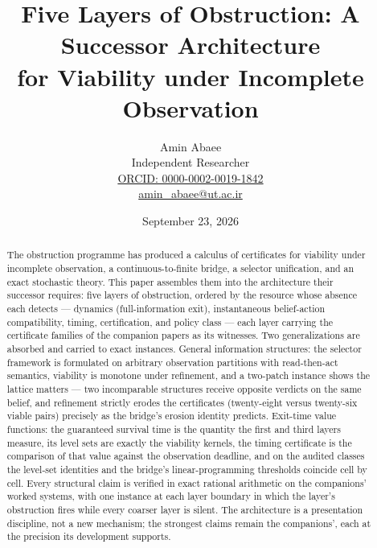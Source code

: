 \documentclass[10pt,twocolumn]{article}
\theoremstyle{definition}
\begin{document}
\title{Five Layers of Obstruction: A Successor Architecture\\ for Viability under Incomplete Observation}
\author{Amin Abaee\\[0.35em]
{\small Independent Researcher}\\[0.55em]
{\small\href{https://orcid.org/0000-0002-0019-1842}{ORCID: 0000-0002-0019-1842}}\\[0.3em]
{\small\href{mailto:amin\_abaee@ut.ac.ir}{amin\_abaee@ut.ac.ir}}}
\date{September 23, 2026}
\maketitle

\begin{abstract}

The obstruction programme has produced a calculus of certificates for
viability under incomplete observation, a continuous-to-finite bridge, a
selector unification, and an exact stochastic theory. This paper assembles
them into the architecture their successor requires: five layers of
obstruction, ordered by the resource whose absence each detects ---
dynamics (full-information exit), instantaneous belief-action compatibility,
timing, certification, and policy class --- each layer carrying the
certificate families of the companion papers as its witnesses. Two
generalizations are absorbed and carried to exact instances. General
information structures: the selector framework is formulated on arbitrary
observation partitions with read-then-act semantics, viability is monotone
under refinement, and a two-patch instance shows the lattice matters ---
two incomparable structures receive opposite verdicts on the same belief,
and refinement strictly erodes the certificates (twenty-eight versus
twenty-six viable pairs) precisely as the bridge's erosion identity
predicts. Exit-time value functions: the guaranteed survival time is the
quantity the first and third layers measure, its level sets are exactly the
viability kernels, the timing certificate is the comparison of that value
against the observation deadline, and on the audited classes the level-set
identities and the bridge's linear-programming thresholds coincide cell by
cell. Every structural claim is verified in exact rational arithmetic on
the companions' worked systems, with one instance at each layer boundary in
which the layer's obstruction fires while every coarser layer is silent.
The architecture is a presentation discipline, not a new mechanism; the
strongest claims remain the companions', each at the precision its
development supports.

\end{abstract}
\end{document}
